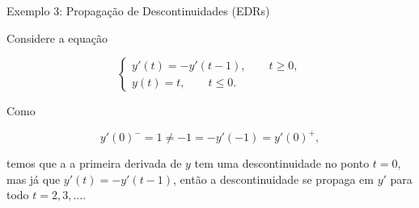 \documentclass{beamer}
\theoremstyle{plain}
\theoremstyle{definition}
\begin{document}

\begin{frame}{Exemplo 3: Propagação de Descontinuidades (EDRs)}

     Considere a equação 

     \begin{equation}
       \begin{cases}
          y'(t) = -y'(t - 1), \qquad t \geq 0,  \\
          y(t) = t, \qquad t \leq 0.
       \end{cases}
      \label{chap1:ex5:eq:1}
     \end{equation}

     Como 

     \[
       y'(0)^- = 1 \neq -1 = - y'(-1) = y'(0)^+,
     \]
    
     \noindent
     temos que a a primeira derivada de $y$ tem uma descontinuidade no ponto $t = 0$, mas já que $y'(t) = -y'(t - 1)$, então a descontinuidade se propaga em $y'$ para todo $t = 2, 3, \dots$. 


\end{frame}

\end{document}
